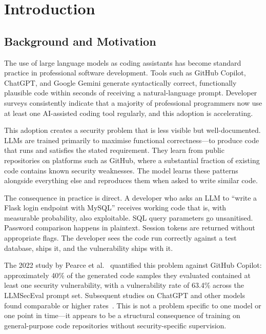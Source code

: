 \documentclass[12pt,a4paper]{report}
\begin{document}
\setcounter{page}{8}

\chapter{Introduction}
\label{ch:introduction}

\section{Background and Motivation}
\label{sec:background}

The use of large language models as coding assistants has become standard
practice in professional software development. Tools such as GitHub Copilot,
ChatGPT, and Google Gemini generate syntactically correct, functionally plausible
code within seconds of receiving a natural-language prompt. Developer surveys
consistently indicate that a majority of professional programmers now use at
least one AI-assisted coding tool regularly, and this adoption is accelerating.

This adoption creates a security problem that is less visible but well-documented.
LLMs are trained primarily to maximise functional correctness---to produce code
that runs and satisfies the stated requirement. They learn from public repositories
on platforms such as GitHub, where a substantial fraction of existing code contains
known security weaknesses. The model learns these patterns alongside everything
else and reproduces them when asked to write similar code.

The consequence in practice is direct. A developer who asks an LLM to ``write a
Flask login endpoint with MySQL'' receives working code that is, with measurable
probability, also exploitable. SQL query parameters go unsanitised. Password
comparison happens in plaintext. Session tokens are returned without appropriate
flags. The developer sees the code run correctly against a test database, ships
it, and the vulnerability ships with it.

The 2022 study by Pearce et al.~\cite{pearce2022asleep} quantified this problem
against GitHub Copilot: approximately 40\% of the generated code samples they
evaluated contained at least one security vulnerability, with a vulnerability
rate of 63.4\% across the LLMSecEval prompt set. Subsequent studies on ChatGPT
and other models found comparable or higher rates~\cite{khoury2023secure,
tony2023llmseceval}. This is not a problem specific to one model or one point in
time---it appears to be a structural consequence of training on general-purpose
code repositories without security-specific supervision.
\end{document}
